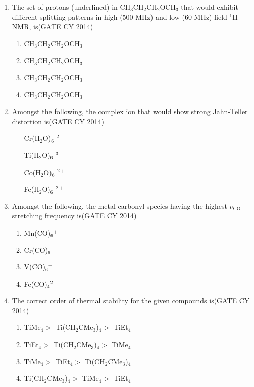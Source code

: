 \documentclass[a4paper,10pt]{exam}
\theoremstyle{remark}
\begin{document}
\begin{enumerate}
\item The set of protons (underlined) in CH$_3$CH$_2$CH$_2$OCH$_3$ that would exhibit different splitting patterns in high (500 MHz) and low (60 MHz) field $^1$H NMR, is\hfill{(GATE CY 2014)}
\begin{enumerate}
    \item \underline{CH}$_3$CH$_2$CH$_2$OCH$_3$
    \item CH$_3$\underline{CH}$_2$CH$_2$OCH$_3$
    \item CH$_3$CH$_2$\underline{CH}$_2$OCH$_3$
    \item CH$_3$CH$_2$CH$_2$OCH$_3$
\end{enumerate}


\item Amongst the following, the complex ion that would show strong Jahn-Teller distortion is\hfill{(GATE CY 2014)}
\begin{multicols}{4}
\begin{enumerate}
    \item [Cr(H$_2$O)$_6$]$^{2+}$
    \item [Ti(H$_2$O)$_6$]$^{3+}$
    \item [Co(H$_2$O)$_6$]$^{2+}$
    \item [Fe(H$_2$O)$_6$]$^{2+}$
\end{enumerate}
\end{multicols} 

\item Amongst the following, the metal carbonyl species having the highest $\nu_{\mathrm{CO}}$ stretching frequency is\hfill{(GATE CY 2014)}
\begin{multicols}{4}
\begin{enumerate} 
    \item Mn(CO)$_6$$^{+}$
    \item Cr(CO)$_6$
    \item V(CO)$_6$$^{-}$
    \item Fe(CO)$_4$$^{2-}$
\end{enumerate}
\end{multicols}

\item The correct order of thermal stability for the given compounds is\hfill{(GATE CY 2014)}
\begin{enumerate} 
    \item TiMe$_4 >$ Ti(CH$_2$CMe$_3$)$_4 >$ TiEt$_4$
    \item TiEt$_4 >$ Ti(CH$_2$CMe$_3$)$_4 >$ TiMe$_4$
    \item TiMe$_4 >$ TiEt$_4 >$ Ti(CH$_2$CMe$_3$)$_4$
    \item Ti(CH$_2$CMe$_3$)$_4 >$ TiMe$_4 >$ TiEt$_4$
\end{enumerate}


\end{enumerate}
\end{document}
